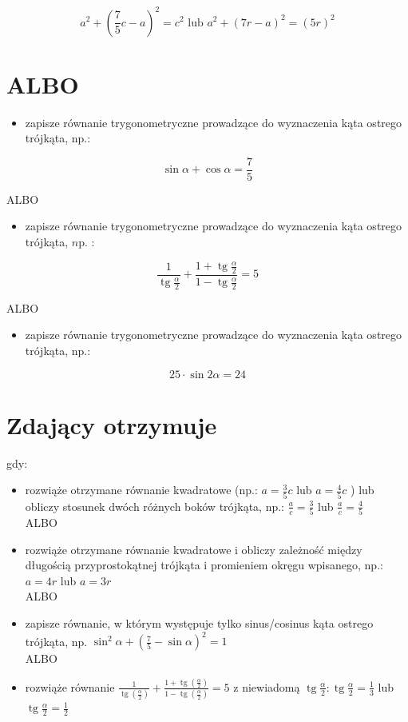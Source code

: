\documentclass[10pt]{article}
\begin{document}
$$
a^{2}+\left(\frac{7}{5} c-a\right)^{2}=c^{2} \text { lub } a^{2}+(7 r-a)^{2}=(5 r)^{2}
$$

\section*{ALBO}
\begin{itemize}
  \item zapisze równanie trygonometryczne prowadzące do wyznaczenia kąta ostrego trójkąta, np.:
\end{itemize}

$$
\sin \alpha+\cos \alpha=\frac{7}{5}
$$

ALBO

\begin{itemize}
  \item zapisze równanie trygonometryczne prowadzące do wyznaczenia kąta ostrego trójkąta, $n \mathrm{p}$. :
\end{itemize}

$$
\frac{1}{\operatorname{tg} \frac{\alpha}{2}}+\frac{1+\operatorname{tg} \frac{\alpha}{2}}{1-\operatorname{tg} \frac{\alpha}{2}}=5
$$

ALBO

\begin{itemize}
  \item zapisze równanie trygonometryczne prowadzące do wyznaczenia kąta ostrego trójkąta, np.:
\end{itemize}

$$
25 \cdot \sin 2 \alpha=24
$$

\section*{Zdający otrzymuje}
gdy:

\begin{itemize}
  \item rozwiąże otrzymane równanie kwadratowe (np.: $a=\frac{3}{5} c$ lub $a=\frac{4}{5} c$ ) lub obliczy stosunek dwóch różnych boków trójkąta, np.: $\frac{a}{c}=\frac{3}{5}$ lub $\frac{a}{c}=\frac{4}{5}$\\
ALBO
  \item rozwiąże otrzymane równanie kwadratowe i obliczy zależność między długością przyprostokątnej trójkąta i promieniem okręgu wpisanego, np.: $a=4 r$ lub $a=3 r$\\
ALBO
  \item zapisze równanie, w którym występuje tylko sinus/cosinus kąta ostrego trójkąta, np. $\sin ^{2} \alpha+\left(\frac{7}{5}-\sin \alpha\right)^{2}=1$\\
ALBO
  \item rozwiąże równanie $\frac{1}{\operatorname{tg}\left(\frac{\alpha}{2}\right)}+\frac{1+\operatorname{tg}\left(\frac{\alpha}{2}\right)}{1-\operatorname{tg}\left(\frac{\alpha}{2}\right)}=5$ z niewiadomą $\operatorname{tg} \frac{\alpha}{2}: \operatorname{tg} \frac{\alpha}{2}=\frac{1}{3}$ lub $\operatorname{tg} \frac{\alpha}{2}=\frac{1}{2}$
\end{itemize}
\end{document}
